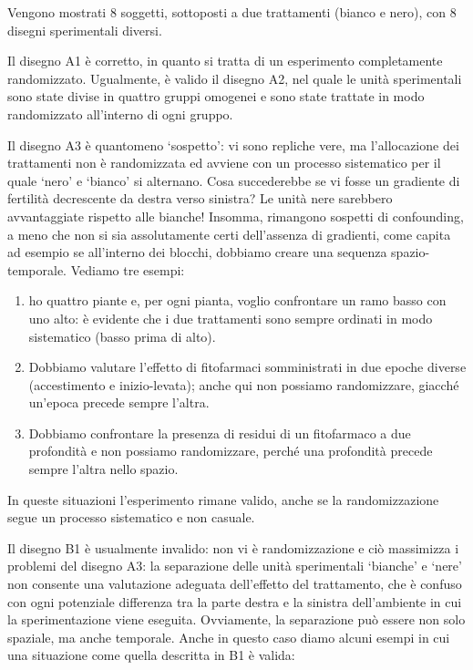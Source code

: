 \documentclass[a4paper,12pt,oneside]{book}
\providecommand{\tightlist}{%
  \setlength{\itemsep}{0pt}\setlength{\parskip}{0pt}}
\theoremstyle{definition}
\theoremstyle{definition}
\theoremstyle{definition}
\theoremstyle{remark}
\begin{document}
Vengono mostrati 8 soggetti, sottoposti a due trattamenti (bianco e
nero), con 8 disegni sperimentali diversi.

Il disegno A1 è corretto, in quanto si tratta di un esperimento
completamente randomizzato. Ugualmente, è valido il disegno A2, nel
quale le unità sperimentali sono state divise in quattro gruppi omogenei
e sono state trattate in modo randomizzato all'interno di ogni gruppo.

Il disegno A3 è quantomeno `sospetto': vi sono repliche vere, ma
l'allocazione dei trattamenti non è randomizzata ed avviene con un
processo sistematico per il quale `nero' e `bianco' si alternano. Cosa
succederebbe se vi fosse un gradiente di fertilità decrescente da destra
verso sinistra? Le unità nere sarebbero avvantaggiate rispetto alle
bianche! Insomma, rimangono sospetti di confounding, a meno che non si
sia assolutamente certi dell'assenza di gradienti, come capita ad
esempio se all'interno dei blocchi, dobbiamo creare una sequenza
spazio-temporale. Vediamo tre esempi:

\begin{enumerate}
\def\labelenumi{\arabic{enumi}.}
\tightlist
\item
  ho quattro piante e, per ogni pianta, voglio confrontare un ramo basso
  con uno alto: è evidente che i due trattamenti sono sempre ordinati in
  modo sistematico (basso prima di alto).
\item
  Dobbiamo valutare l'effetto di fitofarmaci somministrati in due epoche
  diverse (accestimento e inizio-levata); anche qui non possiamo
  randomizzare, giacché un'epoca precede sempre l'altra.
\item
  Dobbiamo confrontare la presenza di residui di un fitofarmaco a due
  profondità e non possiamo randomizzare, perché una profondità precede
  sempre l'altra nello spazio.
\end{enumerate}

In queste situazioni l'esperimento rimane valido, anche se la
randomizzazione segue un processo sistematico e non casuale.

Il disegno B1 è usualmente invalido: non vi è randomizzazione e ciò
massimizza i problemi del disegno A3: la separazione delle unità
sperimentali `bianche' e `nere' non consente una valutazione adeguata
dell'effetto del trattamento, che è confuso con ogni potenziale
differenza tra la parte destra e la sinistra dell'ambiente in cui la
sperimentazione viene eseguita. Ovviamente, la separazione può essere
non solo spaziale, ma anche temporale. Anche in questo caso diamo alcuni
esempi in cui una situazione come quella descritta in B1 è valida:
\end{document}
